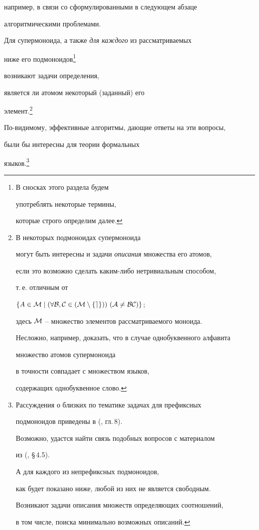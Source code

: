  например, в связи со сформулированными в следующем абзаце


 алгоритмическими проблемами.





 Для супермоноида, а также {\it для каждого} из рассматриваемых 


ниже его подмоноидов\footnote{В сносках этого раздела будем


употреблять некоторые термины,


которые строго определим далее.}


 возникают задачи \label{alg5} определения,


 является ли атомом некоторый (заданный) его 


элемент.\footnote{В некоторых подмоноидах супермоноида


 могут быть интересны и задачи {\it описания} множества его атомов,


 если это возможно сделать каким-либо нетривиальным способом,


 т.\,е. отличным от


$\{A\in\CM\mid


(\forall B,C\in(\CM\setminus \{e\}))\ (A\ne BC)\}$;


 здесь $\cal{M}$ -- множество элементов рассматриваемого моноида.


 Несложно, например, доказать, что в случае однобуквенного алфавита


 множество атомов супермоноида


 в точности совпадает с множеством языков,


 содержащих однобуквенное слово.}\setcounter{footnote}{0}\linebreak


 По-видимому, эффективные алгоритмы, дающие ответы на эти вопросы,


 были бы интересны для теории формальных 


языков.\footnote{Рассуждения о близких по тематике задачах для префиксных 


подмоноидов приведены в (\cite{la}, гл.\,8).


 Возможно, удастся найти связь подобных вопросов с материалом


 из (\cite{sal}, \S\,4.5).


 А для каждого из непрефиксных подмоноидов,


 как будет показано ниже, любой из них не является свободным.


 Возникают задачи описания множеств определяющих соотношений,


 в том числе, поиска минимально возможных описаний.}


